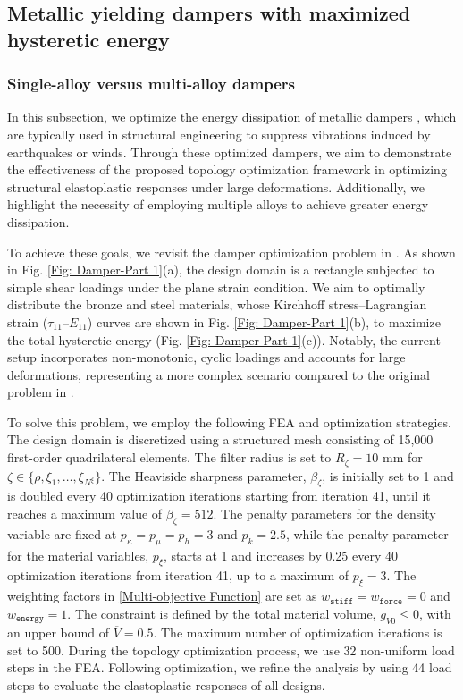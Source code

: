 \documentclass[preprint,11pt]{elsarticle}
\theoremstyle{definition}
\begin{document}
\subsection{Metallic yielding dampers with maximized hysteretic energy}
\label{Sec: Dampers}

\subsubsection{Single-alloy versus multi-alloy dampers}

In this subsection, we optimize the energy dissipation of metallic dampers \citep{zhang_simplified_2018, jia_residual_2022}, which are typically used in structural engineering to suppress vibrations induced by earthquakes or winds. Through these optimized dampers, we aim to demonstrate the effectiveness of the proposed topology optimization framework in optimizing structural elastoplastic responses under large deformations. Additionally, we highlight the necessity of employing multiple alloys to achieve greater energy dissipation.

To achieve these goals, we revisit the damper optimization problem in \citet{jia_multimaterial_2025}. As shown in Fig. \ref{Fig: Damper-Part 1}(a), the design domain is a rectangle subjected to simple shear loadings under the plane strain condition. We aim to optimally distribute the bronze and steel materials, whose Kirchhoff stress--Lagrangian strain ($\tau_{11}$--$E_{11}$) curves are shown in Fig. \ref{Fig: Damper-Part 1}(b), to maximize the total hysteretic energy (Fig. \ref{Fig: Damper-Part 1}(c)). Notably, the current setup incorporates non-monotonic, cyclic loadings and accounts for large deformations, representing a more complex scenario compared to the original problem in \citet{jia_multimaterial_2025}.

To solve this problem, we employ the following FEA and optimization strategies. The design domain is discretized using a structured mesh consisting of 15,000 first-order quadrilateral elements. The filter radius is set to $R_\zeta = 10$ mm for $\zeta \in \{\rho, \xi_1, \ldots, \xi_{N^\xi} \}$. The Heaviside sharpness parameter, $\beta_\zeta$, is initially set to 1 and is doubled every 40 optimization iterations starting from iteration 41, until it reaches a maximum value of $\beta_\zeta = 512$. The penalty parameters for the density variable are fixed at $p_\kappa = p_\mu = p_h = 3$ and $p_k = 2.5$, while the penalty parameter for the material variables, $p_\xi$, starts at 1 and increases by 0.25 every 40 optimization iterations from iteration 41, up to a maximum of $p_\xi = 3$. The weighting factors in \eqref{Multi-objective Function} are set as $w_\texttt{stiff} = w_\texttt{force} = 0$ and $w_\texttt{energy} = 1$. The constraint is defined by the total material volume, $g_{V0} \leq 0$, with an upper bound of $\overline{V} = 0.5$. The maximum number of optimization iterations is set to 500. During the topology optimization process, we use 32 non-uniform load steps in the FEA. Following optimization, we refine the analysis by using 44 load steps to evaluate the elastoplastic responses of all designs.
\end{document}
